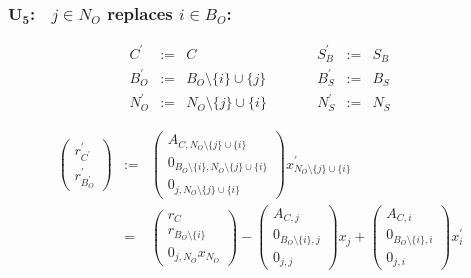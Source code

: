 \documentclass[a4paper]{article}
\begin{document}
\subsubsection{$\mathbf{U_{5}}$:$\quad j \in N_{O}$ replaces $i \in B_{O}$:}
\begin{equation}
\label{update:o_rep_o}
\begin{array}{ccccccc}
C^{\prime}      &:=&  C
&\quad\quad&
S_{B}^{\prime}  &:=&  S_{B}  \\
B_{O}^{\prime}  &:=&  B_{O} \setminus \{i\} \cup \{j\}
&\quad\quad&
B_{S}^{\prime}  &:=&  B_{S}   \\
N_{O}^{\prime}  &:=&  N_{O}  \setminus \{j\} \cup \{i\}
&\quad\quad&
N_{S}^{\prime}  &:=&  N_{S} 
\end{array}
\end{equation}

\begin{eqnarray}
\left(
\begin{array}{c}
r_{C^{\prime}}^{\prime} \\
\hline
r_{B_{O}^{\prime}}^{\prime}
\end{array}
\right)
&:=&
\left(
\begin{array}{c}
A_{C, N_{O}  \setminus \{j\} \cup \{i\}} \\
\hline
0_{B_{O} \setminus \{i\}, N_{O}  \setminus \{j\} \cup \{i\}} \\
\hline
0_{j, N_{O}  \setminus \{j\} \cup \{i\}} 
\end{array}
\right)
x_{N_{O}  \setminus \{j\} \cup \{i\}}^{\prime} \\
&=&
\left(
\begin{array}{c}
r_{C} \\
\hline
r_{B_{O} \setminus \{i\}} \\
\hline
0_{j, N_{O}}x_{N_{O}}
\end{array}
\right)
-
\left(
\begin{array}{c}
A_{C, j} \\
\hline
0_{B_{O} \setminus \{i\}, j} \\
\hline
0_{j, j}
\end{array}
\right)
x_{j}
+
\left(
\begin{array}{c}
A_{C, i} \\
\hline
0_{B_{O} \setminus \{i\}, i} \\
\hline
0_{j,i}
\end{array}
\right)
x_{i}^{\prime}
\end{eqnarray}
\end{document}
